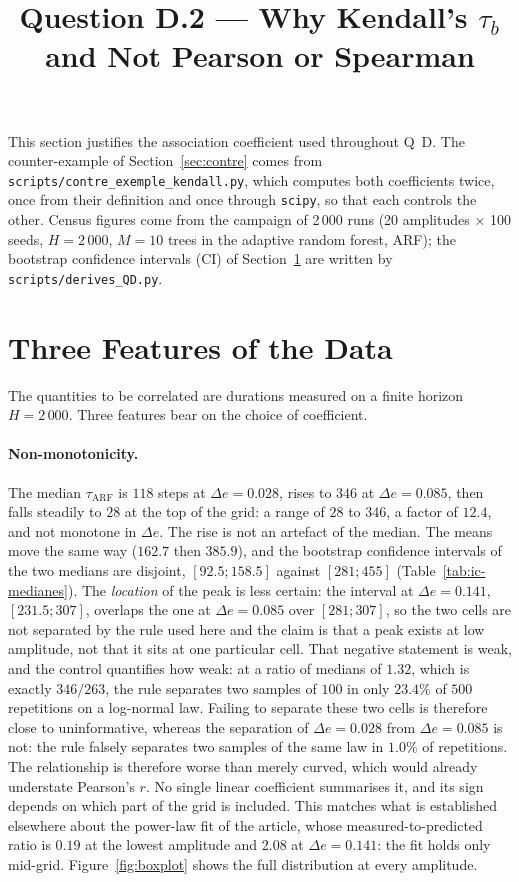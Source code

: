 \documentclass[11pt,a4paper]{article}
\title{Question D.2 --- Why Kendall's $\tau_b$ and Not Pearson or Spearman}
\author{}
\date{}
\begin{document}
\maketitle

\noindent This section justifies the association coefficient used throughout Q~D. The
counter-example of Section~\ref{sec:contre} comes from
\texttt{scripts/contre\_exemple\_kendall.py}, which computes both coefficients twice, once
from their definition and once through \texttt{scipy}, so that each controls the other.
Census figures come from the campaign of 2\,000 runs (20 amplitudes $\times$ 100 seeds,
$H = 2\,000$, $M = 10$ trees in the adaptive random forest, ARF); the bootstrap confidence
intervals (CI) of Section~\ref{sec:features} are written by
\texttt{scripts/derives\_QD.py}.

\section{Three Features of the Data}
\label{sec:features}

The quantities to be correlated are durations measured on a finite horizon $H = 2\,000$.
Three features bear on the choice of coefficient.

\paragraph{Non-monotonicity.} The median $\tau_{\mathrm{ARF}}$ is $118$ steps at
$\Delta e = 0.028$, rises to $346$ at $\Delta e = 0.085$, then falls steadily to $28$ at
the top of the grid: a range of $28$ to $346$, a factor of $12.4$, and not monotone in
$\Delta e$. The rise is not an artefact of the median. The means move the same way
($162.7$ then $385.9$), and the bootstrap confidence intervals of the two medians are
disjoint, $[92.5 ; 158.5]$ against $[281 ; 455]$ (Table~\ref{tab:ic-medianes}). The
\emph{location} of the peak is less certain: the interval at $\Delta e = 0.141$,
$[231.5 ; 307]$, overlaps the one at $\Delta e = 0.085$ over $[281 ; 307]$, so the two
cells are not separated by the rule used here and the claim is that a peak exists at low
amplitude, not that it sits at one particular cell. That negative statement is weak, and
the control quantifies how weak: at a ratio of medians of $1.32$, which is exactly
$346/263$, the rule separates two samples of $100$ in only $23.4\%$ of $500$ repetitions
on a log-normal law. Failing to separate these two cells is therefore close to
uninformative, whereas the separation of $\Delta e = 0.028$ from $\Delta e = 0.085$ is
not: the rule falsely separates two samples of the same law in $1.0\%$ of repetitions. The relationship is therefore worse
than merely curved, which would already understate Pearson's $r$. No single linear
coefficient summarises it, and its sign depends on which part of the grid is included.
This matches what is established elsewhere about the power-law fit of the article, whose
measured-to-predicted ratio is $0.19$ at the lowest amplitude and $2.08$ at
$\Delta e = 0.141$: the fit holds only mid-grid. Figure~\ref{fig:boxplot} shows the full
distribution at every amplitude.
\end{document}
